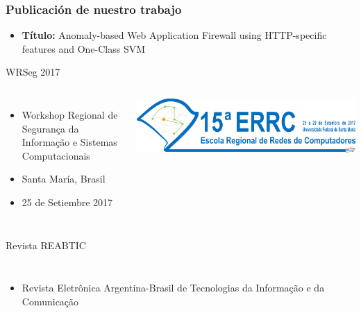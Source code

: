 \begin{frame}
    \frametitle{Publicación de nuestro trabajo}

    \begin{itemize}
        \footnotesize

        \item
        \textbf{Título:}
        Anomaly-based Web Application Firewall using HTTP-specific features
        and One-Class SVM
    \end{itemize}

    \begin{block}{\small WRSeg 2017}
        \begin{columns}
            \begin{itemize}
                \footnotesize

                \item
                Workshop Regional de Segurança da Informação e
                Sistemas Computacionais

                \item
                Santa María, Brasil

                \item
                25 de Setiembre 2017
            \end{itemize}

            \begin{center}
                \includegraphics[width=\textwidth]{images/logo-errc2017.png}
            \end{center}
        \end{columns}
    \end{block}

    \begin{block}{\small Revista REABTIC}
        \begin{columns}
            \begin{itemize}
                \footnotesize

                \item
                Revista Eletrônica Argentina-Brasil de Tecnologias da Informação
                e da Comunicação


\end{itemize}
\end{columns}
\end{block}
\end{frame}
